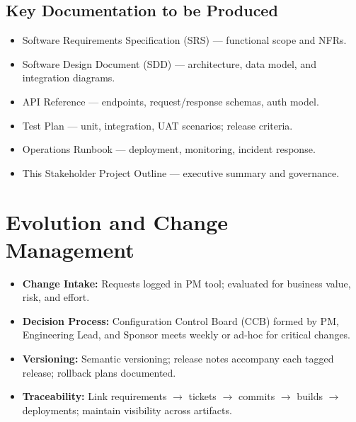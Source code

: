 \documentclass[12pt,a4paper]{article}
\begin{document}
\subsection{Key Documentation to be Produced}
\begin{itemize}
\item Software Requirements Specification (SRS) --- functional scope and NFRs.
\item Software Design Document (SDD) --- architecture, data model, and integration diagrams.
\item API Reference --- endpoints, request/response schemas, auth model.
\item Test Plan --- unit, integration, UAT scenarios; release criteria.
\item Operations Runbook --- deployment, monitoring, incident response.
\item This Stakeholder Project Outline --- executive summary and governance.
\end{itemize}

\section{Evolution and Change Management}
\begin{itemize}
\item \textbf{Change Intake:} Requests logged in PM tool; evaluated for business value, risk, and effort.
\item \textbf{Decision Process:} Configuration Control Board (CCB) formed by PM, Engineering Lead, and Sponsor meets weekly or ad-hoc for critical changes.
\item \textbf{Versioning:} Semantic versioning; release notes accompany each tagged release; rollback plans documented.
\item \textbf{Traceability:} Link requirements $\rightarrow$ tickets $\rightarrow$ commits $\rightarrow$ builds $\rightarrow$ deployments; maintain visibility across artifacts.
\end{itemize}
\end{document}

